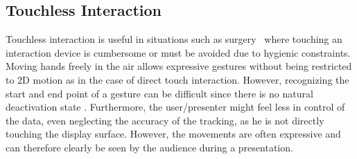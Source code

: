 \documentclass[review,journal]{vgtc}         %
\begin{document}

\begin{figure}
    \centering
    \hfill
\end{figure}

\subsection{Touchless Interaction}
Touchless interaction is useful in situations such as surgery~\cite{Mentis:2012:IPI:2207676.2208536} where touching an interaction device is cumbersome or must be avoided due to hygienic constraints.
Moving hands freely in the air allows expressive gestures without being restricted to 2D motion as in the case of direct touch interaction.
However, recognizing the start and end point of a gesture can be difficult since there is no natural deactivation state \cite{Kirmizibayrak:2011:EGB:2087756.2087764}.
Furthermore, the user/presenter might feel less in control of the data, even neglecting the accuracy of the tracking, as he is not directly touching the display surface.
However, the movements are often expressive and can therefore clearly be seen by the audience during a presentation.
\end{document}
